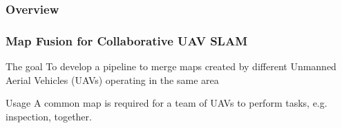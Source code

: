 \documentclass[xcolor={x11names}]{beamer}
\begin{document}
\begin{frame}
  \frametitle{Overview}
  \tableofcontents[currentsection]
\end{frame}


\begin{frame}
\frametitle{Map Fusion for Collaborative UAV SLAM}
\begin{block}{The goal}
To develop a pipeline to merge maps created by different Unmanned Aerial Vehicles (UAVs) operating in the same area
\end{block}
\begin{block}{Usage}
A common map is required for a team of UAVs to perform tasks, e.g. inspection, together.
\end{block}
\end{frame}

\end{document}
